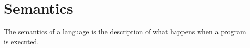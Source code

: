 




\section{Semantics}
The semantics of a language is the description of what happens when a program is executed.

